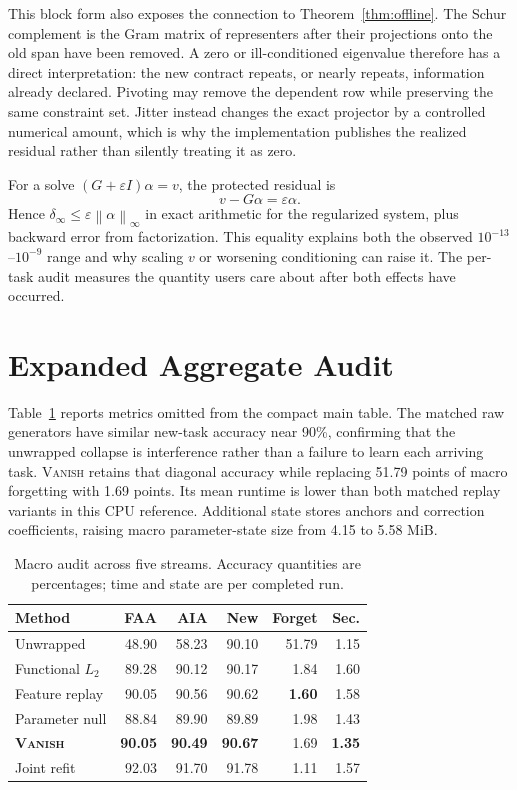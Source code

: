 \documentclass{vanish_ieee}
\theoremstyle{definition}
\newcommand{\norm}[1]{\left\lVert#1\right\rVert}
\newcommand{\VANISH}{\textsc{Vanish}}
\begin{document}
This block form also exposes the connection to Theorem~\ref{thm:offline}.  The Schur complement is the Gram matrix of representers after their projections onto the old span have been removed.  A zero or ill-conditioned eigenvalue therefore has a direct interpretation: the new contract repeats, or nearly repeats, information already declared.  Pivoting may remove the dependent row while preserving the same constraint set.  Jitter instead changes the exact projector by a controlled numerical amount, which is why the implementation publishes the realized residual rather than silently treating it as zero.

For a solve $(G+\varepsilon I)\alpha=v$, the protected residual is
\begin{equation}
v-G\alpha=\varepsilon\alpha.
\end{equation}
Hence $\delta_\infty\leq\varepsilon\norm{\alpha}_\infty$ in exact arithmetic for the regularized system, plus backward error from factorization.  This equality explains both the observed $10^{-13}$--$10^{-9}$ range and why scaling $v$ or worsening conditioning can raise it.  The per-task audit measures the quantity users care about after both effects have occurred.

\section{Expanded Aggregate Audit}

Table~\ref{tab:macroaudit} reports metrics omitted from the compact main table.  The matched raw generators have similar new-task accuracy near 90\%, confirming that the unwrapped collapse is interference rather than a failure to learn each arriving task.  \VANISH{} retains that diagonal accuracy while replacing 51.79 points of macro forgetting with 1.69 points.  Its mean runtime is lower than both matched replay variants in this CPU reference.  Additional state stores anchors and correction coefficients, raising macro parameter-state size from 4.15 to 5.58 MiB.

\begin{table}[h]
\centering
\caption{Macro audit across five streams.  Accuracy quantities are percentages; time and state are per completed run.}
\label{tab:macroaudit}
\scriptsize
\begin{tabular}{lrrrrr}
\toprule
Method & FAA & AIA & New & Forget & Sec.\\
\midrule
Unwrapped & 48.90 & 58.23 & 90.10 & 51.79 & 1.15\\
Functional $L_2$ & 89.28 & 90.12 & 90.17 & 1.84 & 1.60\\
Feature replay & 90.05 & 90.56 & 90.62 & \textbf{1.60} & 1.58\\
Parameter null & 88.84 & 89.90 & 89.89 & 1.98 & 1.43\\
\textbf{\VANISH} & \textbf{90.05} & \textbf{90.49} & \textbf{90.67} & 1.69 & \textbf{1.35}\\
Joint refit & 92.03 & 91.70 & 91.78 & 1.11 & 1.57\\
\bottomrule
\end{tabular}
\end{table}
\end{document}
